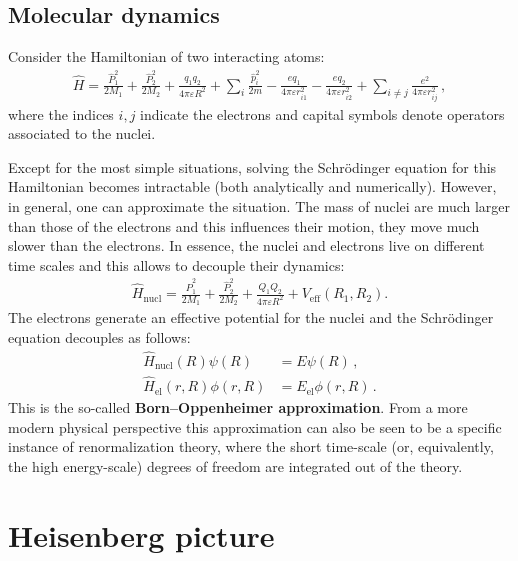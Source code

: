 \subsection{Molecular dynamics}

    Consider the Hamiltonian of two interacting atoms:
    \begin{gather}
        \hat{H} = \frac{\hat{P}_1^2}{2M_1} + \frac{\hat{P}_2^2}{2M_2} + \frac{q_1q_2}{4\pi\varepsilon R^2} + \sum_i\frac{\hat{p}_i^2}{2m} - \frac{eq_1}{4\pi\varepsilon r_{i1}^2} - \frac{eq_2}{4\pi\varepsilon r_{i2}^2} + \sum_{i\neq j}\frac{e^2}{4\pi\varepsilon r_{ij}^2}\,,
    \end{gather}
    where the indices $i,j$ indicate the electrons and capital symbols denote operators associated to the nuclei.

    Except for the most simple situations, solving the Schr\"odinger equation for this Hamiltonian becomes intractable (both analytically and numerically). However, in general, one can approximate the situation. The mass of nuclei are much larger than those of the electrons and this influences their motion, they move much slower than the electrons. In essence, the nuclei and electrons live on different time scales and this allows to decouple their dynamics:
    \begin{gather}
        \hat{H}_{\text{nucl}} = \frac{\hat{P}_1^2}{2M_1} + \frac{\hat{P}_2^2}{2M_2} + \frac{Q_1Q_2}{4\pi\varepsilon R^2} + V_{\text{eff}}(R_1,R_2).
    \end{gather}
    The electrons generate an effective potential for the nuclei and the Schr\"odinger equation decouples as follows:
    \begin{align}
        \hat{H}_{\text{nucl}}(R)\psi(R) &= E\psi(R)\,,\\
        \hat{H}_{\text{el}}(r,R)\phi(r,R) &= E_{\text{el}}\phi(r,R)\,.
    \end{align}
    This is the so-called \textbf{Born--Oppenheimer approximation}. From a more modern physical perspective this approximation can also be seen to be a specific instance of renormalization theory, where the short time-scale (or, equivalently, the high energy-scale) degrees of freedom are integrated out of the theory.

\section{Heisenberg picture}

